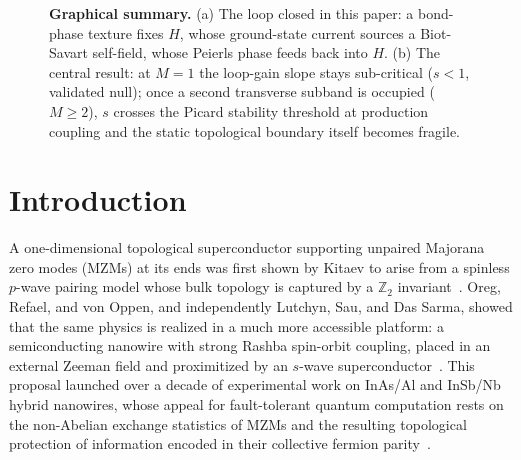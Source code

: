 \documentclass[aps,physrev,reprint,superscriptaddress,amsmath,amssymb,floatfix]{revtex4-2}
\begin{document}
\begin{figure}[t]
\caption{\textbf{Graphical summary.} (a) The loop closed in this paper: a
bond-phase texture fixes $H$, whose ground-state current sources a
Biot-Savart self-field, whose Peierls phase feeds back into $H$. (b) The
central result: at $M=1$ the loop-gain slope stays sub-critical ($s<1$,
validated null); once a second transverse subband is occupied
($M\geq2$), $s$ crosses the Picard stability threshold at production
coupling and the static topological boundary itself becomes fragile.}
\label{fig:graphical_abstract}
\end{figure}

\section{Introduction}
\label{sec:intro}

A one-dimensional topological superconductor supporting unpaired Majorana
zero modes (MZMs) at its ends was first shown by Kitaev to arise from a
spinless $p$-wave pairing model whose bulk topology is captured by a
$\mathbb{Z}_2$ invariant~\cite{kitaev2001}. Oreg, Refael, and von Oppen,
and independently Lutchyn, Sau, and Das Sarma, showed that the same
physics is realized in a much more accessible platform: a semiconducting
nanowire with strong Rashba spin-orbit coupling, placed in an external
Zeeman field and proximitized by an $s$-wave
superconductor~\cite{oreg2010,lutchyn2010}. This proposal launched over a
decade of experimental work on InAs/Al and InSb/Nb hybrid nanowires, whose
appeal for fault-tolerant quantum computation rests on the non-Abelian
exchange statistics of MZMs and the resulting topological protection of
information encoded in their collective fermion parity~\cite{lutchyn2018review}.
\end{document}
